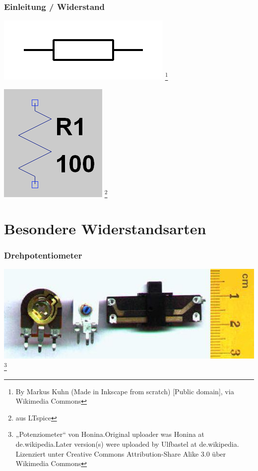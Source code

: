 \begin{frame}
    \frametitle{Einleitung / Widerstand}

    \begin{center}
        \includegraphics[width=.4\textwidth]{e04/Resistor_symbol_IEC.png}
        \footnote{\tiny By Markus Kuhn (Made in Inkscape from scratch) [Public domain], via Wikimedia Commons}
    \end{center}

    \begin{center}
        \includegraphics[width=.4\textwidth]{e04/R_LTspice.png}
        \footnote{\tiny aus LTspice}
    \end{center}
 	
\end{frame}

\section*{Besondere Widerstandsarten}
\begin{frame}
    \frametitle{Drehpotentiometer}

    \begin{center}
        \includegraphics[width=.5\textwidth]{e04/Potenziometer.jpg}
        \footnote{\tiny „Potenziometer“ von Honina.Original uploader was Honina at de.wikipedia.Later version(s) were uploaded by Ulfbastel at de.wikipedia. Lizenziert unter Creative Commons Attribution-Share Alike 3.0 über Wikimedia Commons}
    \end{center}
 	
\end{frame}

